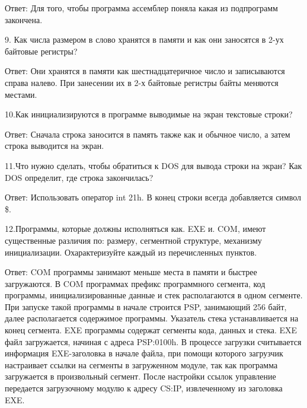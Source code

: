 \documentclass{report}
\begin{document}
Ответ: Для того, чтобы программа ассемблер поняла какая из подпрограмм закончена.

9.  Как числа размером в слово хранятся в памяти и как они заносятся в 2-ух байтовые регистры?

Ответ: Они хранятся в памяти как шестнадцатеричное число и записываются справа налево. При занесении их в 2-х байтовые регистры байты меняются местами.

10.Как инициализируются в программе выводимые на экран текстовые строки?

Ответ: Сначала строка заносится в память также как и обычное число, а затем строка выводится на экран.

11.Что нужно сделать, чтобы обратиться к DOS для вывода строки на экран? Как DOS определит, где строка закончилась?

Ответ: Использовать оператор int 21h. В конец строки всегда добавляется символ \$.

12.Программы, которые должны исполняться как. EXE и. COM, имеют существенные различия по: размеру, сегментной структуре, механизму инициализации. Охарактеризуйте каждый из перечисленных пунктов.

Ответ: COM программы занимают меньше места в памяти и быстрее загружаются. В COM программах префикс программного сегмента, код программы, инициализированные данные и стек располагаются в одном сегменте. При запуске такой программы в начале строится PSP, занимающий 256 байт, далее располагается содержимое программы. Указатель стека устанавливается на конец сегмента.
EXE программы содержат сегменты кода, данных и стека. EXE файл загружается, начиная с адреса PSP:0100h. В процессе загрузки считывается информация EXE-заголовка в начале файла, при помощи которого загрузчик настраивает ссылки на сегменты в загруженном модуле, так как программа загружается в произвольный сегмент. После настройки ссылок управление передается загрузочному модулю к адресу CS:IP, извлеченному из заголовка EXE.
\end{document}
